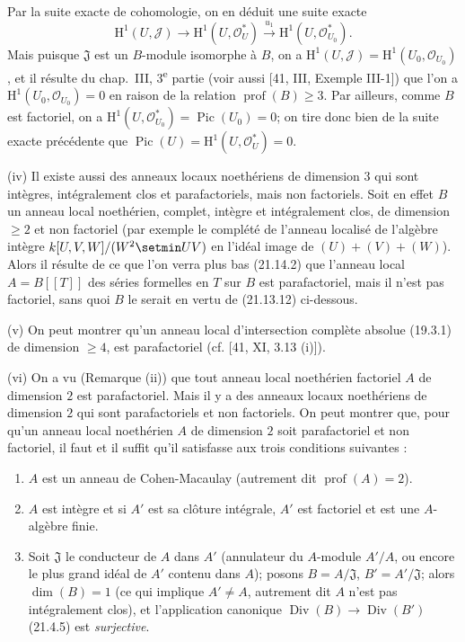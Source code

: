 \begin{examples}[21.13.9]
Par la suite exacte de cohomologie, on en déduit une suite exacte
\[
\label{IV.21.13.9.1}
  \mathrm H^1(U,\mathscr J)\longrightarrow\mathrm H^1(U,\mathcal O_U^*)
  \xrightarrow{u_1}\mathrm H^1(U,\mathcal O_{U_0}^*).
  \tag{21.13.9.1}
\]
Mais puisque $\mathfrak J$ est un $B$-module isomorphe à $B$, on a
$\mathrm H^1(U,\mathscr J)=\mathrm H^1(U_0,\mathcal O_{U_0})$, et il résulte du
chap.~III, 3\textsuperscript{e} partie (voir aussi [41, III, Exemple III-1]) que l'on a
$\mathrm H^1(U_0,\mathcal O_{U_0})=0$ en raison de la relation
$\operatorname{prof}(B)\geq3$. Par ailleurs, comme $B$ est factoriel, on a
$\mathrm H^1(U,\mathcal O_{U_0}^*)=\operatorname{Pic}(U_0)=0$; on tire donc bien de
la suite exacte précédente que
$\operatorname{Pic}(U)=\mathrm H^1(U,\mathcal O_U^*)=0$.

(iv) Il existe aussi des anneaux locaux noethériens de dimension $3$ qui sont
intègres, intégralement clos et parafactoriels, mais non factoriels. Soit en effet $B$
un anneau local noethérien, complet, intègre et intégralement clos, de dimension
$\geq2$ et non factoriel (par exemple le complété de l'anneau localisé de l'algèbre
intègre $k[U,V,W]/(W^2\setmin UV)$ en l'idéal image de $(U)+(V)+(W)$). Alors il résulte de
ce que l'on verra plus bas (21.14.2) que l'anneau local $A=B[[T]]$ des séries formelles
en $T$ sur $B$ est parafactoriel, mais il n'est pas factoriel, sans quoi $B$ le serait
en vertu de (21.13.12) ci-dessous.

(v) On peut montrer qu'un anneau local d'intersection complète absolue (19.3.1) de
dimension $\geq4$, est parafactoriel (cf. [41, XI, 3.13 (i)]).

(vi) On a vu (Remarque (ii)) que tout anneau local noethérien factoriel $A$ de
dimension $2$ est parafactoriel. Mais il y a des anneaux locaux noethériens de
dimension $2$ qui sont parafactoriels et non factoriels. On peut montrer que, pour
qu'un anneau local noethérien $A$ de dimension $2$ soit parafactoriel et non
factoriel, il faut et il suffit qu'il satisfasse aux trois conditions suivantes :
\begin{enumerate}[label=\arabic*\textsuperscript{o}]
  \item $A$ est un anneau de Cohen-Macaulay (autrement dit
  $\operatorname{prof}(A)=2$).
  \item $A$ est intègre et si $A'$ est sa clôture intégrale, $A'$ est factoriel et est
  une $A$-algèbre finie.
  \item Soit $\mathfrak J$ le conducteur de $A$ dans $A'$ (annulateur du $A$-module
  $A'/A$, ou encore le plus grand idéal de $A'$ contenu dans $A$); posons
  $B=A/\mathfrak J$, $B'=A'/\mathfrak J$; alors $\dim(B)=1$ (ce qui implique
  $A'\neq A$, autrement dit $A$ n'est pas intégralement clos), et l'application
  canonique $\operatorname{Div}(B)\to\operatorname{Div}(B')$ (21.4.5) est
  \emph{surjective}.
\end{enumerate}


\end{examples}

